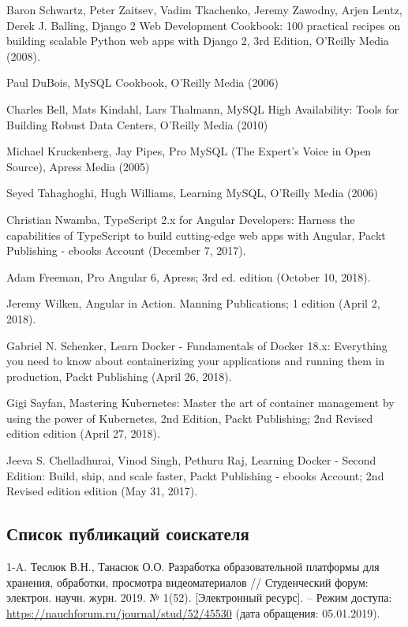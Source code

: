 \begin{thebibliography}{}
\bibitem{}
  Baron Schwartz, Peter Zaitsev, Vadim Tkachenko, Jeremy Zawodny, Arjen Lentz, Derek J. Balling,
  Django 2 Web Development Cookbook: 100 practical recipes on building scalable Python web apps with Django 2, 3rd Edition,
  O'Reilly Media (2008).


\bibitem{}
  Paul DuBois,
  MySQL Cookbook,
  O'Reilly Media (2006)

\bibitem{}
  Charles Bell, Mats Kindahl, Lars Thalmann,
  MySQL High Availability: Tools for Building Robust Data Centers,
  O'Reilly Media (2010)

\bibitem{}
  Michael Kruckenberg, Jay Pipes,
  Pro MySQL (The Expert's Voice in Open Source),
  Apress Media (2005)

\bibitem{}
  Seyed Tahaghoghi, Hugh Williams,
  Learning MySQL,
  O'Reilly Media (2006)

  Christian Nwamba,
  TypeScript 2.x for Angular Developers: Harness the capabilities of TypeScript to build cutting-edge web apps with Angular,
  Packt Publishing - ebooks Account (December 7, 2017).

  Adam Freeman,
  Pro Angular 6,
  Apress; 3rd ed. edition (October 10, 2018).

  Jeremy Wilken,
  Angular in Action.
  Manning Publications; 1 edition (April 2, 2018).

  Gabriel N. Schenker,
  Learn Docker - Fundamentals of Docker 18.x: Everything you need to know about containerizing your applications and running them in production,
  Packt Publishing (April 26, 2018).

  Gigi Sayfan,
  Mastering Kubernetes: Master the art of container management by using the power of Kubernetes, 2nd Edition,
  Packt Publishing; 2nd Revised edition edition (April 27, 2018).

  Jeeva S. Chelladhurai, Vinod Singh, Pethuru Raj,
  Learning Docker - Second Edition: Build, ship, and scale faster,
  Packt Publishing - ebooks Account; 2nd Revised edition edition (May 31, 2017).

\end{thebibliography}

\newpage

\subsection*{Список публикаций соискателя}

1-A. Теслюк В.Н., Танасюк О.О.
  Разработка образовательной платформы для хранения, обработки, просмотра видеоматериалов
  // Студенческий форум: электрон. научн. журн. 2019. № 1(52).
  [Электронный ресурс]. – Режим доступа:
  \href{https://nauchforum.ru/journal/stud/52/45530}{https://nauchforum.ru/journal/stud/52/45530}
  (дата обращения: 05.01.2019).


\endgroup